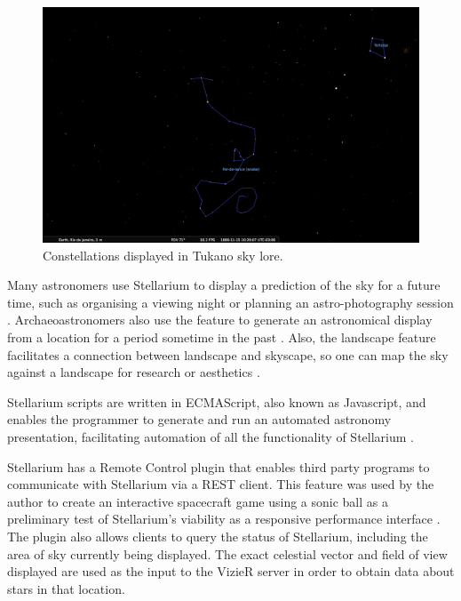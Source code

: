 \documentclass[10pt,a4paper,extrafontsizes]{memoir}
\begin{document}
\begin{figure}[htbp]
	\centering
	\includegraphics[width=1\columnwidth]{TukanoTortoise}
	\caption{Constellations displayed in Tukano sky lore.}
	\label{fig:TukanoTortoise}
\end{figure}

Many astronomers use Stellarium to display a prediction of the sky for a future time, such as organising a viewing night or planning an astro-photography session \cite{ashley2015computers}. Archaeoastronomers  also use the feature to generate an astronomical display from a location for a period sometime in the past \cite{zotti2014towards}. Also, the landscape feature facilitates a connection between  landscape and  skyscape, so one can map the sky against a landscape for research or aesthetics \cite{zotti2017skyscape}.

Stellarium scripts are written in ECMAScript, also known as Javascript, and enables the programmer to generate and run an automated astronomy presentation, facilitating  automation of all the functionality of Stellarium  \cite{zottistellarium}. 

Stellarium has a Remote Control plugin that enables third party programs to communicate with Stellarium via a REST client. This feature was used by the author to create an interactive spacecraft game using a sonic ball as a preliminary test of Stellarium's viability as a responsive performance interface \cite{fraiettaLAC2019}. The plugin also allows clients to query the status of Stellarium, including the area of sky currently being displayed.  The exact celestial vector and field of view displayed are used as the input to the VizieR server in order to obtain data about stars in that location.
\end{document}
